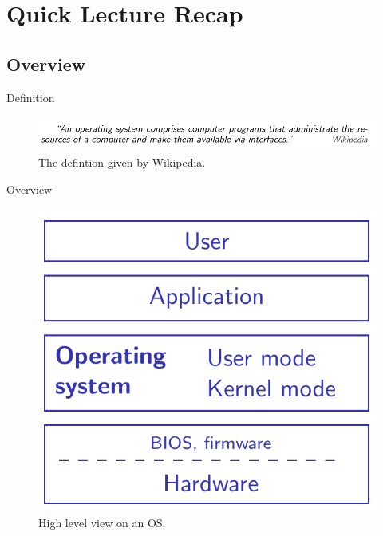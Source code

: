 \documentclass[10pt]{beamer}
\begin{document}
\section{Quick Lecture Recap}
\frame{\sectionpage}
\subsection{Overview}
\begin{frame}{Definition}
\begin{figure}
       \begin{center}
       \includegraphics[keepaspectratio, width=\textwidth,height=0.9\textheight-4\baselineskip]{img/100_definition.png}
      \end{center}
      \caption{The defintion given by Wikipedia.~\autocite{wiki}}
      \end{figure}
\end{frame}

\begin{frame}{Overview}
\begin{figure}
       \begin{center}
       \includegraphics[keepaspectratio, width=\textwidth,height=0.9\textheight-4\baselineskip]{img/101_overview.png}
      \end{center}
      \caption{High level view on an OS.~\autocite{mrupp}}
      \end{figure}
\end{frame}
\end{document}
